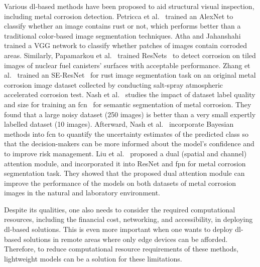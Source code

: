 \documentclass[mathematics,article,submit,pdftex,moreauthors]{Definitions/mdpi}
\begin{document}
Various \ac{dl}-based methods have been proposed
to aid structural visual inspection, including metal
corrosion detection. Petricca et al.~\cite{Petricca2016}
trained an AlexNet to classify whether
an image contains rust or not, which performs
better than a traditional color-based image segmentation
techniques. Atha and Jahanshahi~\cite{Atha2018}
trained a VGG network to classify whether patches
of images contain corroded areas. Similarly,
Papamarkou et al.~\cite{Papamarkou2021}
trained ResNets~\cite{He2016} to detect corrosion
on tiled images of nuclear fuel canisters' surfaces
with acceptable performance. Zhang et al.~\cite{Zhang2021}
trained an SE-ResNet~\cite{Hu2018} for
rust image segmentation task on an original metal
corrosion image dataset collected by conducting 
salt-spray atmospheric accelerated corrosion test.
Nash et al.~\cite{Nash2019}
studies the impact of dataset label quality 
and size for training an \ac{fcn}~\cite{Long2015}
for semantic segmentation of metal corrosion. 
They found that a large noisy dataset (250 images)
is better than a very small expertly labelled 
dataset (10 images). Afterward, 
Nash et al.~\cite{Nash2022} incorporate
Bayesian methods into \ac{fcn}
to quantify the uncertainty estimates 
of the predicted class so that the decision-makers
can be more informed about the model's confidence and 
to improve risk management. Liu et al.~\cite{Liu2023}
proposed a dual (spatial and channel) attention module,
and incorporated it into ResNet and \ac{fpn} for 
metal corrosion segmentation task. They showed that
the proposed dual attention module can improve the performance
of the models on both datasets of metal corrosion
images in the natural and laboratory environment. 

Despite its qualities, one also needs to consider
the required computational resources, including
the financial cost, networking, and accessibility,
in deploying \ac{dl}-based solutions.
This is even more important when one wants to 
deploy \ac{dl}-based solutions in remote
areas where only edge devices can be afforded.
Therefore, to reduce computational resource requirements
of these methods, lightweight 
models can be a solution for these limitations.
\end{document}
